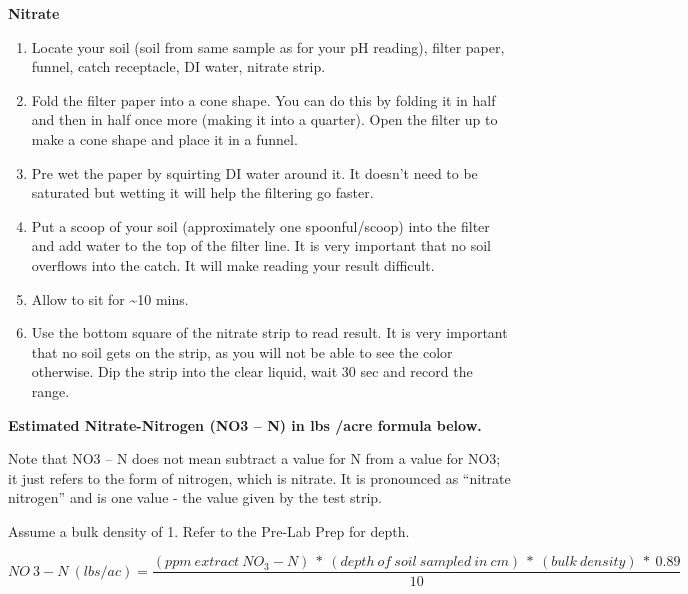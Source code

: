 \documentclass[
  letterpaper,
  twocolumn,
  portrait]{scrbook}
\begin{document}
\textbf{Nitrate}

\begin{enumerate}
\def\labelenumi{\arabic{enumi}.}
\item
  Locate your soil (soil from same sample as for your pH reading),
  filter paper, funnel, catch receptacle, DI water, nitrate strip.
\item
  Fold the filter paper into a cone shape. You can do this by folding it
  in half and then in half once more (making it into a quarter). Open
  the filter up to make a cone shape and place it in a funnel.
\item
  Pre wet the paper by squirting DI water around it. It doesn't need to
  be saturated but wetting it will help the filtering go faster.
\item
  Put a scoop of your soil (approximately one spoonful/scoop) into the
  filter and add water to the top of the filter line. It is very
  important that no soil overflows into the catch. It will make reading
  your result difficult.
\item
  Allow to sit for \textasciitilde10 mins.
\item
  Use the bottom square of the nitrate strip to read result. It is very
  important that no soil gets on the strip, as you will not be able to
  see the color otherwise. Dip the strip into the clear liquid, wait 30
  sec and record the range.
\end{enumerate}

\textbf{Estimated Nitrate-Nitrogen (NO3 -- N) in lbs /acre formula
below.}

Note that NO3 -- N does not mean subtract a value for N from a value for
NO3; it just refers to the form of nitrogen, which is nitrate. It is
pronounced as ``nitrate nitrogen'' and is one value - the value given by
the test strip.

Assume a bulk density of 1. Refer to the Pre-Lab Prep for depth.

\[
NO\ {3}-N\ (lbs/ac) = \frac{(ppm\ extract\ NO_{3}-N)\ *\ (depth\ of\ soil\ sampled\ in\ cm)\ *\ (bulk\ density)\ *\ 0.89}{10}
\]

 
  \providecommand{\huxb}[2]{\arrayrulecolor[RGB]{#1}\global\arrayrulewidth=#2pt}
  \providecommand{\huxvb}[2]{\color[RGB]{#1}\vrule width #2pt}
  \providecommand{\huxtpad}[1]{\rule{0pt}{#1}}
  \providecommand{\huxbpad}[1]{\rule[-#1]{0pt}{#1}}
\end{document}
